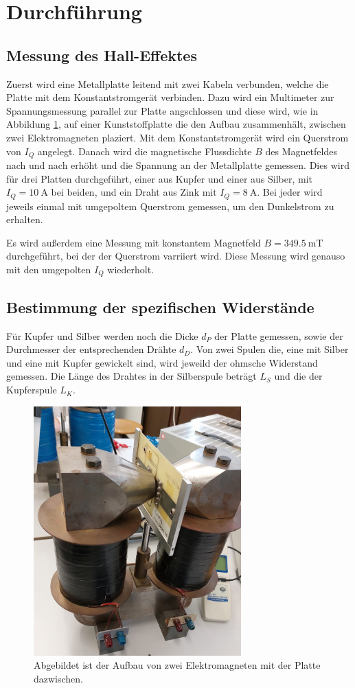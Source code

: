 \section{Durchführung}
\label{sec:Durchführung}

\subsection{Messung des Hall-Effektes}
Zuerst wird eine Metallplatte leitend mit zwei Kabeln verbunden, welche die Platte mit dem Konstantstromgerät verbinden. 
Dazu wird ein Multimeter zur Spannungsmessung parallel zur Platte angschlossen und diese wird, wie in Abbildung \ref{fig:Elektromagnet}, auf einer Kunststoffplatte die den Aufbau zusammenhält, zwischen zwei Elektromagneten plaziert.
Mit dem Konstantstromgerät wird ein Querstrom von $I_Q$ angelegt.
Danach wird die magnetische Flussdichte $B$ des Magnetfeldes nach und nach erhöht und die Spannung an der Metallplatte gemessen.
Dies wird für drei Platten durchgeführt, einer aus Kupfer und einer aus Silber, mit $I_Q=\qty{10}{\ampere}$ bei beiden, und ein Draht aus Zink mit $I_Q=\qty{8}{\ampere}$.
Bei jeder wird jeweils einmal mit umgepoltem Querstrom gemessen, um den Dunkelstrom zu erhalten.


Es wird außerdem eine Messung mit konstantem Magnetfeld $B=\qty{349.5}{\milli\tesla}$ durchgeführt, bei der der Querstrom varriiert wird. 
Diese Messung wird genauso mit den umgepolten $I_Q$ wiederholt.

\subsection{Bestimmung der spezifischen Widerstände}
Für Kupfer und Silber werden noch die Dicke $d_P$ der Platte gemessen, sowie der Durchmesser der entsprechenden Drähte $d_D$.
Von zwei Spulen die, eine mit Silber und eine mit Kupfer gewickelt sind, wird jeweild der ohmsche Widerstand gemessen.
Die Länge des Drahtes in der Silberspule beträgt $L_S$ und die der Kupferspule $L_K$.

 \begin{figure}[H]
     \centering
     \includegraphics[width=8cm]{Bilder/Elektromagnet.jpg}
     \caption{Abgebildet ist der Aufbau von zwei Elektromagneten mit der Platte dazwischen.}
     \label{fig:Elektromagnet}
 \end{figure}